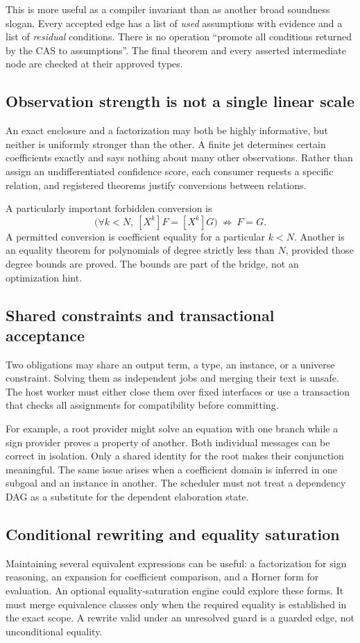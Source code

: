 \documentclass[11pt,a4paper]{article}
\theoremstyle{definition}
\begin{document}
This is more useful as a compiler invariant than as another broad soundness
slogan. Every accepted edge has a list of \emph{used} assumptions with evidence
and a list of \emph{residual} conditions. There is no operation ``promote all
conditions returned by the CAS to assumptions''. The final theorem and every
asserted intermediate node are checked at their approved types.

\subsection{Observation strength is not a single linear scale}
An exact enclosure and a factorization may both be highly informative, but
neither is uniformly stronger than the other. A finite jet determines certain
coefficients exactly and says nothing about many other observations. Rather
than assign an undifferentiated confidence score, each consumer requests a
specific relation, and registered theorems justify conversions between relations.

A particularly important forbidden conversion is
\[
 \bigl(\forall k<N,\ [X^k]F=[X^k]G\bigr)
 \ \not\Longrightarrow\ F=G.
\]
A permitted conversion is coefficient equality for a particular $k<N$. Another
is an equality theorem for polynomials of degree strictly less than $N$, provided
those degree bounds are proved. The bounds are part of the bridge, not an
optimization hint.

\subsection{Shared constraints and transactional acceptance}
Two obligations may share an output term, a type, an instance, or a universe
constraint. Solving them as independent jobs and merging their text is unsafe.
The host worker must either close them over fixed interfaces or use a transaction
that checks all assignments for compatibility before committing.

For example, a root provider might solve an equation with one branch while a
sign provider proves a property of another. Both individual messages can be
correct in isolation. Only a shared identity for the root makes their conjunction
meaningful. The same issue arises when a coefficient domain is inferred in one
subgoal and an instance in another. The scheduler must not treat a dependency
DAG as a substitute for the dependent elaboration state.

\subsection{Conditional rewriting and equality saturation}
Maintaining several equivalent expressions can be useful: a factorization for
sign reasoning, an expansion for coefficient comparison, and a Horner form for
evaluation. An optional equality-saturation engine could explore these forms.
It must merge equivalence classes only when the required equality is established
in the exact scope. A rewrite valid under an unresolved guard is a guarded edge,
not unconditional equality.
\end{document}
